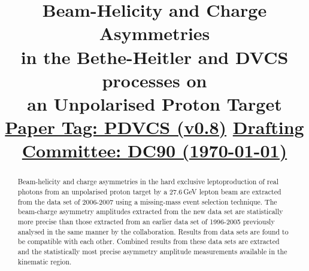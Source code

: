 \documentclass{elsart}
\begin{document}
 \begin{frontmatter}

\title{
	Beam-Helicity and Charge Asymmetries \\
        in the Bethe-Heitler and DVCS processes on \\
        an Unpolarised Proton Target
  	\underline{Paper Tag: PDVCS (v0.8)}
        \underline{Drafting Committee: DC90 (\today)}
}

\begin{abstract}
Beam-helicity and charge asymmetries in the hard exclusive leptoproduction of
real photons from an unpolarised proton target by a 27.6\,GeV lepton beam 
are extracted from the  data set of 2006-2007 using a
missing-mass event selection technique. The beam-charge asymmetry amplitudes extracted from the new data set are statistically more precise than those extracted from an earlier data set of 1996-2005 previously analysed in the same manner by the collaboration. Results from  data sets are found to be compatible with each other. Combined results from these data sets are extracted and  the statistically most precise asymmetry amplitude measurements available in the  kinematic region.
\end{abstract}

\end{frontmatter}
% 
\setvruler[15pt][1][1][3][1][30pt][30pt][-42pt]








\end{document}
